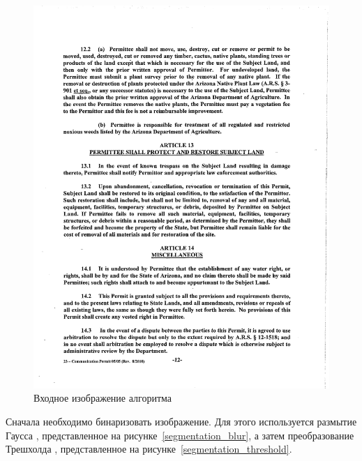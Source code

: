 \begin{figure}
    \includegraphics[scale=0.5]{img/paragraph/input.png}
    \caption{Входное изображение алгоритма}
    \label{segmentation_input}
\end{figure}

Сначала необходимо бинаризовать изображение. Для этого используется размытие Гаусса \cite{gauss_blur}, представленное на рисунке~\ref{segmentation_blur}, а затем преобразование Трешхолда \cite{opencv_threshold}, представленное на рисунке~\ref{segmentation_threshold}.

